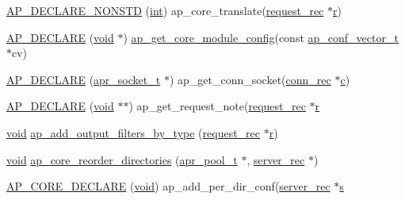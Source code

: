 \begin{DoxyCompactItemize}
\item 
\hyperlink{group__APACHE__CORE__HTTPD_gadd80c95db47e2b0fa1a866192d3bfc9a}{A\+P\+\_\+\+D\+E\+C\+L\+A\+R\+E\+\_\+\+N\+O\+N\+S\+TD} (\hyperlink{pcre_8txt_a42dfa4ff673c82d8efe7144098fbc198}{int}) ap\+\_\+core\+\_\+translate(\hyperlink{structrequest__rec}{request\+\_\+rec} $\ast$\hyperlink{pcregrep_8txt_a2e9e9438b26c0bb4425367a7e4f75eb3}{r})
\item 
\hyperlink{group__APACHE__CORE__HTTPD_gab1fe9b59405e33a6d2b8e40e7fc5247d}{A\+P\+\_\+\+D\+E\+C\+L\+A\+RE} (\hyperlink{group__MOD__ISAPI_gacd6cdbf73df3d9eed42fa493d9b621a6}{void} $\ast$) \hyperlink{group__APACHE__CORE__HTTPD_ga5e96e185d9e95051576a4fbb7846ae51}{ap\+\_\+get\+\_\+core\+\_\+module\+\_\+config}(const \hyperlink{group__APACHE__CORE__CONFIG_ga614684670dbf748a70ac6bad272da59c}{ap\+\_\+conf\+\_\+vector\+\_\+t} $\ast$cv)
\item 
\hyperlink{group__APACHE__CORE__HTTPD_gad5a5d3d05dabc4cb4273749dd68e3b4c}{A\+P\+\_\+\+D\+E\+C\+L\+A\+RE} (\hyperlink{structapr__socket__t}{apr\+\_\+socket\+\_\+t} $\ast$) ap\+\_\+get\+\_\+conn\+\_\+socket(\hyperlink{structconn__rec}{conn\+\_\+rec} $\ast$\hyperlink{pcregrep_8txt_aef720ae5f62fa015619d00171d917416}{c})
\item 
\hyperlink{group__APACHE__CORE__HTTPD_ga11627cc99e4780ee4d99f44213d571b0}{A\+P\+\_\+\+D\+E\+C\+L\+A\+RE} (\hyperlink{group__MOD__ISAPI_gacd6cdbf73df3d9eed42fa493d9b621a6}{void} $\ast$$\ast$) ap\+\_\+get\+\_\+request\+\_\+note(\hyperlink{structrequest__rec}{request\+\_\+rec} $\ast$\hyperlink{pcregrep_8txt_a2e9e9438b26c0bb4425367a7e4f75eb3}{r}
\item 
\hyperlink{group__MOD__ISAPI_gacd6cdbf73df3d9eed42fa493d9b621a6}{void} \hyperlink{group__APACHE__CORE__HTTPD_ga084d496781c6d77fad666fc7188b8a82}{ap\+\_\+add\+\_\+output\+\_\+filters\+\_\+by\+\_\+type} (\hyperlink{structrequest__rec}{request\+\_\+rec} $\ast$\hyperlink{pcregrep_8txt_a2e9e9438b26c0bb4425367a7e4f75eb3}{r})
\item 
\hyperlink{group__MOD__ISAPI_gacd6cdbf73df3d9eed42fa493d9b621a6}{void} \hyperlink{group__APACHE__CORE__HTTPD_gac5142771a693b025760ed4048352b73c}{ap\+\_\+core\+\_\+reorder\+\_\+directories} (\hyperlink{structapr__pool__t}{apr\+\_\+pool\+\_\+t} $\ast$, \hyperlink{structserver__rec}{server\+\_\+rec} $\ast$)
\item 
\hyperlink{group__APACHE__CORE__HTTPD_gaf46742fb201ee84b106ff75dd90699a3}{A\+P\+\_\+\+C\+O\+R\+E\+\_\+\+D\+E\+C\+L\+A\+RE} (\hyperlink{group__MOD__ISAPI_gacd6cdbf73df3d9eed42fa493d9b621a6}{void}) ap\+\_\+add\+\_\+per\+\_\+dir\+\_\+conf(\hyperlink{structserver__rec}{server\+\_\+rec} $\ast$\hyperlink{pcretest_8txt_a062597889ba244b72877454b1d3adecf}{s}
$$
\end{DoxyCompactItemize}

